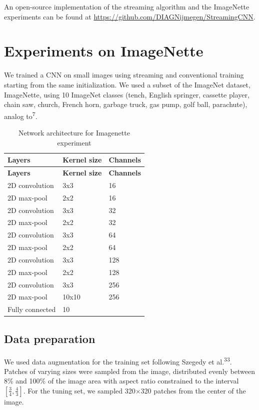 \documentclass[
  12pt,
  a5,margin=2cmpaper,
]{article}
\begin{document}
An open-source implementation of the streaming algorithm and the
ImageNette experiments can be found at
\url{https://github.com/DIAGNijmegen/StreamingCNN}.

\hypertarget{section:imagenette}{%
\section{Experiments on ImageNette}\label{section:imagenette}}

We trained a CNN on small images using streaming and conventional
training starting from the same initialization. We used a subset of the
ImageNet dataset, ImageNette, using 10 ImageNet classes (tench, English
springer, cassette player, chain saw, church, French horn, garbage
truck, gas pump, golf ball, parachute), analog to\textsuperscript{7}.

\hypertarget{tab:imagenetnet}{}
\begin{longtable}[]{@{}lll@{}}
\caption{Network architecture for Imagenette experiment}\tabularnewline
\toprule\noalign{}
\textbf{Layers} & \textbf{Kernel size} & \textbf{Channels} \\
\midrule\noalign{}
\endfirsthead
\toprule\noalign{}
\textbf{Layers} & \textbf{Kernel size} & \textbf{Channels} \\
\midrule\noalign{}
\endhead
\bottomrule\noalign{}
\endlastfoot
2D convolution & 3x3 & 16 \\
2D max-pool & 2x2 & 16 \\
2D convolution & 3x3 & 32 \\
2D max-pool & 2x2 & 32 \\
2D convolution & 3x3 & 64 \\
2D max-pool & 2x2 & 64 \\
2D convolution & 3x3 & 128 \\
2D max-pool & 2x2 & 128 \\
2D convolution & 3x3 & 256 \\
2D max-pool & 10x10 & 256 \\
Fully connected & 10 & \\
\end{longtable}

\hypertarget{data-preparation}{%
\subsection{Data preparation}\label{data-preparation}}

We used data augmentation for the training set following Szegedy et
al.\textsuperscript{33}. Patches of varying sizes were sampled from the
image, distributed evenly between 8\% and 100\% of the image area with
aspect ratio constrained to the interval \([\frac{3}{4}, \frac{4}{3}]\).
For the tuning set, we sampled 320\(\times\)320 patches from the center
of the image.
\end{document}
